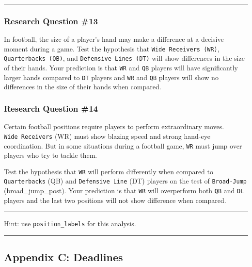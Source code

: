 \documentclass[
]{article}
\begin{document}
\begin{center}\rule{0.5\linewidth}{0.5pt}\end{center}

\hypertarget{research-question-13}{%
\subsubsection{Research Question \#13}\label{research-question-13}}

In football, the size of a player's hand may make a difference at a decisive moment during a game. Test the hypothesis that \texttt{Wide\ Receivers\ (WR)}, \texttt{Quarterbacks\ (QB)}, and \texttt{Defensive\ Lines\ (DT)} will show differences in the size of their hands. Your prediction is that \texttt{WR} and \texttt{QB} players will have significantly larger hands compared to \texttt{DT} players and \texttt{WR} and \texttt{QB} players will show no differences in the size of their hands when compared.

\hypertarget{research-question-14}{%
\subsubsection{Research Question \#14}\label{research-question-14}}

Certain football positions require players to perform extraordinary moves. \texttt{Wide\ Receivers} (WR) must show blazing speed and strong hand-eye coordination. But in some situations during a football game, \texttt{WR} must jump over players who try to tackle them.

Test the hypothesis that \texttt{WR} will perform differently when compared to \texttt{Quarterbacks} (QB) and \texttt{Defensive\ Line} (DT) players on the test of \texttt{Broad-Jump} (broad\_jump\_post). Your prediction is that \texttt{WR} will overperform both \texttt{QB} and \texttt{DL} players and the last two positions will not show difference when compared.

\begin{center}\rule{0.5\linewidth}{0.5pt}\end{center}

Hint: use \texttt{position\_labels} for this analysis.

\begin{center}\rule{0.5\linewidth}{0.5pt}\end{center}

\hypertarget{deadlines}{%
\subsection{Appendix C: Deadlines}\label{deadlines}}
\end{document}
